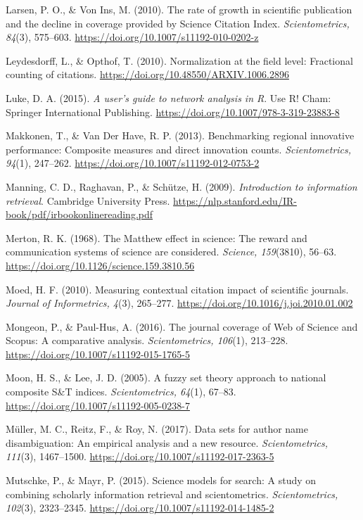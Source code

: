 \documentclass[
  letterpaper,
]{scrreprt}
\begin{document}
Larsen, P. O., \& Von Ins, M. (2010). The rate of growth in scientific
publication and the decline in coverage provided by Science Citation
Index. \emph{Scientometrics, 84}(3), 575--603.
\url{https://doi.org/10.1007/s11192-010-0202-z}

Leydesdorff, L., \& Opthof, T. (2010). Normalization at the field level:
Fractional counting of citations.
\url{https://doi.org/10.48550/ARXIV.1006.2896}

Luke, D. A. (2015). \emph{A user's guide to network analysis in R}. Use
R! Cham: Springer International Publishing.
\url{https://doi.org/10.1007/978-3-319-23883-8}

Makkonen, T., \& Van Der Have, R. P. (2013). Benchmarking regional
innovative performance: Composite measures and direct innovation counts.
\emph{Scientometrics, 94}(1), 247--262.
\url{https://doi.org/10.1007/s11192-012-0753-2}

Manning, C. D., Raghavan, P., \& Schütze, H. (2009). \emph{Introduction
to information retrieval}. Cambridge University Press.
\url{https://nlp.stanford.edu/IR-book/pdf/irbookonlinereading.pdf}

Merton, R. K. (1968). The Matthew effect in science: The reward and
communication systems of science are considered. \emph{Science,
159}(3810), 56--63. \url{https://doi.org/10.1126/science.159.3810.56}

Moed, H. F. (2010). Measuring contextual citation impact of scientific
journals. \emph{Journal of Informetrics, 4}(3), 265--277.
\url{https://doi.org/10.1016/j.joi.2010.01.002}

Mongeon, P., \& Paul-Hus, A. (2016). The journal coverage of Web of
Science and Scopus: A comparative analysis. \emph{Scientometrics,
106}(1), 213--228. \url{https://doi.org/10.1007/s11192-015-1765-5}

Moon, H. S., \& Lee, J. D. (2005). A fuzzy set theory approach to
national composite S\&T indices. \emph{Scientometrics, 64}(1), 67--83.
\url{https://doi.org/10.1007/s11192-005-0238-7}

Müller, M. C., Reitz, F., \& Roy, N. (2017). Data sets for author name
disambiguation: An empirical analysis and a new resource.
\emph{Scientometrics, 111}(3), 1467--1500.
\url{https://doi.org/10.1007/s11192-017-2363-5}

Mutschke, P., \& Mayr, P. (2015). Science models for search: A study on
combining scholarly information retrieval and scientometrics.
\emph{Scientometrics, 102}(3), 2323--2345.
\url{https://doi.org/10.1007/s11192-014-1485-2}
\end{document}
